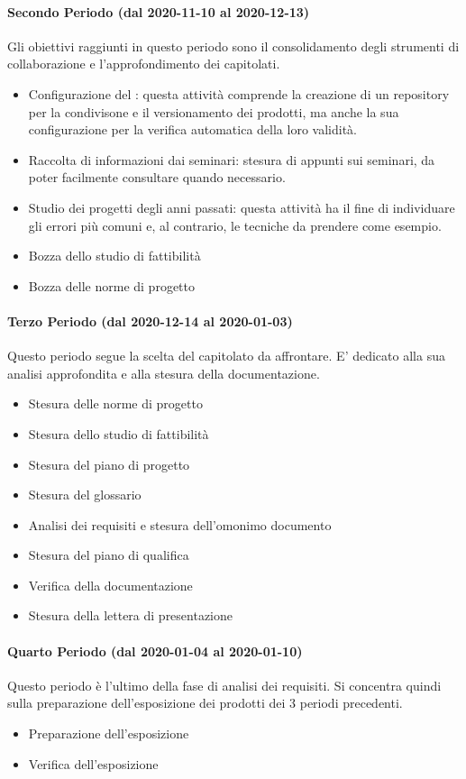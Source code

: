 \paragraph{Secondo Periodo (dal 2020-11-10 al 2020-12-13)}
Gli obiettivi raggiunti in questo periodo sono il consolidamento degli strumenti di collaborazione e l'approfondimento dei capitolati.
\begin{itemize}
	\item Configurazione del : questa attività comprende la creazione di un repository per la condivisone e il versionamento dei prodotti, ma anche la sua configurazione per la verifica automatica della loro validità.
	\item Raccolta di informazioni dai seminari: stesura di appunti sui seminari, da poter facilmente consultare quando necessario.
	\item Studio dei progetti degli anni passati: questa attività ha il fine di individuare gli errori più comuni e, al contrario, le tecniche da prendere come esempio.
	\item Bozza dello studio di fattibilità
	\item Bozza delle norme di progetto
\end{itemize}

\paragraph{Terzo Periodo (dal 2020-12-14 al 2020-01-03)}
Questo periodo segue la scelta del capitolato da affrontare. E' dedicato alla sua analisi approfondita e alla stesura della documentazione. 
\begin{itemize}
	\item Stesura delle norme di progetto
	\item Stesura dello studio di fattibilità
	\item Stesura del piano di progetto
	\item Stesura del glossario
	\item Analisi dei requisiti e stesura dell'omonimo documento
	\item Stesura del piano di qualifica
	\item Verifica della documentazione
	\item Stesura della lettera di presentazione
\end{itemize}

\paragraph{Quarto Periodo (dal 2020-01-04 al 2020-01-10)}
Questo periodo è l'ultimo della fase di analisi dei requisiti. Si concentra quindi sulla preparazione dell'esposizione dei prodotti dei 3 periodi precedenti.
\begin{itemize}
	\item Preparazione dell'esposizione
	\item Verifica dell'esposizione
\end{itemize}


